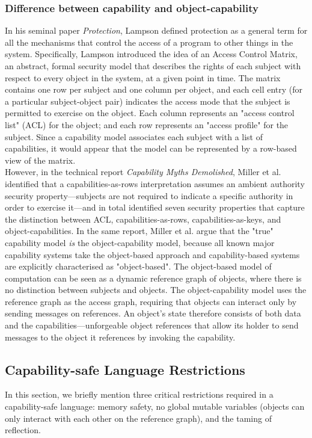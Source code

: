 \documentclass[a4paper,11pt,twoside]{article}
\begin{document}
\subsubsection{Difference between capability and object-capability}
In his seminal paper \textit{Protection}\cite{lampson1974}, Lampson defined protection as a general term for all the mechanisms that control the access of a program to other things in the system. Specifically, Lampson introduced the idea of an Access Control Matrix, an abstract, formal security model that describes the rights of each subject with respect to every object in the system, at a given point in time. The matrix contains one row per subject and one column per object, and each cell entry (for a particular subject-object pair) indicates the access mode that the subject is permitted to exercise on the object. Each column represents an "access control list" (ACL) for the object; and each row represents an "access profile" for the subject. Since a capability model associates each subject with a list of capabilities, it would appear that the model can be represented by a row-based view of the matrix.\\

However, in the technical report \textit{Capability Myths Demolished}\cite{miller2003}, Miller et al. identified that a capabilities-as-rows interpretation assumes an ambient authority security property---subjects are not required to indicate a specific authority in order to exercise it---and in total identified seven security properties that capture the distinction between ACL, capabilities-as-rows, capabilities-as-keys, and object-capabilities. In the same report, Miller et al. argue that the "true" capability model \textit{is} the object-capability model, because all known major capability systems take the object-based approach and capability-based systems are explicitly characterised as "object-based". The object-based model of computation can be seen as a dynamic reference graph of objects, where there is no distinction between subjects and objects. The object-capability model uses the reference graph as the access graph, requiring that objects can interact only by sending messages on references. An object's state therefore consists of both data and the capabilities---unforgeable object references that allow its holder to send messages to the object it references by invoking the capability.

\subsection{Capability-safe Language Restrictions}
In this section, we briefly mention three critical restrictions required in a capability-safe language: memory safety, no global mutable variables (objects can only interact with each other on the reference graph), and the taming of reflection.
\end{document}
